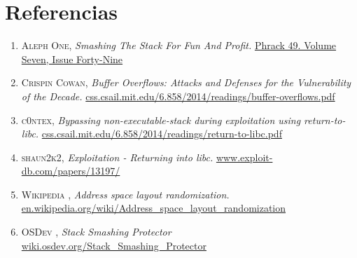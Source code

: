 \documentclass[12pt]{article}
\begin{document}
\section{Referencias}
\begin{enumerate}
\item \textsc{Aleph One},
\textit{Smashing The Stack For Fun And Profit.}
\href{http://phrack.org/issues/49/14.html}{Phrack 49. Volume Seven, Issue Forty-Nine}


\item \textsc{Crispin Cowan},
\textit{Buffer Overflows: Attacks and Defenses for the Vulnerability of the Decade.}
\url{css.csail.mit.edu/6.858/2014/readings/buffer-overflows.pdf}

\item \textsc{c0ntex},
\textit{Bypassing non-executable-stack during exploitation using return-to-libc.}
\url{css.csail.mit.edu/6.858/2014/readings/return-to-libc.pdf}

\item \textsc{shaun2k2},
\textit{Exploitation - Returning into libc.}
\url{www.exploit-db.com/papers/13197/}

\item \textsc{ Wikipedia },
\textit{ Address space layout randomization.}
\url{en.wikipedia.org/wiki/Address_space_layout_randomization}

\item \textsc{ OSDev },
\textit{ Stack Smashing Protector}
\url{wiki.osdev.org/Stack_Smashing_Protector}

\end{enumerate}
\end{document}
